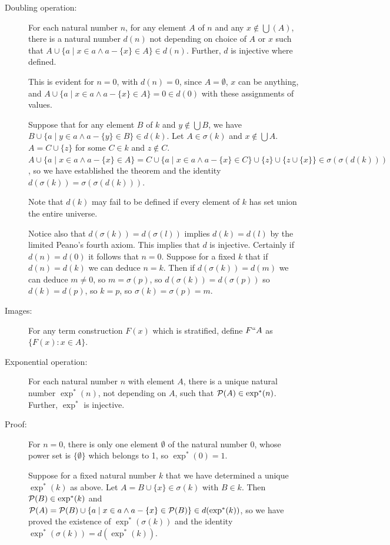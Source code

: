 \documentclass[12pt]{article}
\begin{document}
\begin{description}
\item[Doubling operation:]  For each natural number $n$, for any element $A$ of $n$ and any $x \not\in \bigcup(A)$, there is a natural number $d(n)$ not depending on choice of $A$ or $x$ such
that $A \cup \{a\mid x \in a \wedge a-\{x\} \in A\} \in d(n)$.  Further, $d$ is injective where defined.

This is evident for $n=0$, with $d(n)=0$, since $A=\emptyset$, $x$ can be anything, and $A \cup \{a\mid x \in a \wedge a-\{x\} \in A\} =0 \in d(0)$ with these assignments of values.

Suppose that for any element $B$ of $k$ and $y \not\in \bigcup B$, we have $B \cup \{a\mid y \in a \wedge a-\{y\} \in B\} \in d(k)$.  Let $A \in \sigma(k)$ and $x \not\in \bigcup A$.  $A = C \cup \{z\}$ for
some $C \in k$ and $z \not\in C$.  $A \cup \{a\mid x \in a \wedge a-\{x\} \in A\} = C \cup \{a\mid x \in a \wedge a-\{x\} \in C \}\cup \{z\} \cup \{z \cup \{x\}\} \in \sigma(\sigma(d(k)))$, so we have established the theorem
and the identity $d(\sigma(k))= \sigma(\sigma(d(k)))$.

Note that $d(k)$ may fail to be defined if every element of $k$ has set union the entire universe.

Notice also that $d(\sigma(k))=d(\sigma(l))$ implies $d(k)=d(l)$ by the limited Peano's fourth axiom.  This implies that $d$ is injective.  Certainly if $d(n)=d(0)$ it follows that $n=0$.  Suppose for a fixed $k$
that if $d(n)=d(k)$ we can deduce $n=k$.  Then if $d(\sigma(k))=d(m)$ we can deduce $m \neq 0$, so $m=\sigma(p)$, so $d(\sigma(k))=d(\sigma(p))$ so $d(k)=d(p)$, so $k=p$, so $\sigma(k)=\sigma(p)=m$.

\item[Images:]  For any term construction $F(x)$ which is stratified, define $F``A$ as $\{F(x):x \in A\}$.

\item[Exponential operation:]  For each natural number $n$ with element $A$, there is a unique natural number $\exp^*(n)$, not depending on $A$, such that ${\cal P}(A)\in \exp^*(n)$.  Further, $\exp^*$ is injective.

\item[Proof:]  For $n=0$, there is only one element $\emptyset$ of the natural number 0, whose power set is $\{\emptyset\}$ which belongs to 1, so $\exp^*(0)=1$.

Suppose for a fixed natural number $k$ that we have determined a unique $\exp^*(k)$ as above.  Let $A = B \cup \{x\} \in \sigma(k)$ with $B \in k$.   Then ${\cal P}(B) \in \exp^*(k)$
and ${\cal P}(A) = {\cal P}(B) \cup \{a\mid x \in a \wedge a-\{x\} \in {\cal P}(B)\} \in d(\exp^*(k))$, so we have proved the existence of $\exp^*(\sigma(k))$ and the identity $\exp^*(\sigma(k))=d(\exp^*(k))$.


\end{description}
\end{document}
